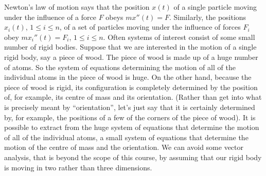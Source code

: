 Newton's law of motion says that the position $x(t)$
of a single particle moving under the influence
of a force $F$ obeys $mx''(t)=F$. Similarly, the positions $x_i(t)$,
$1\le i\le n$, of a set of particles moving under the influence
of forces $F_i$ obey $mx_i''(t)=F_i$, $1\le i\le n$. Often systems of
interest consist of some small number of rigid bodies. Suppose that
we are interested in the motion of a single rigid body, say a piece
of wood. The piece of wood is made up of a huge number of atoms.
So the system of equations determining the motion of all of the
individual atoms in the piece of wood is huge. On the other hand,
because the piece of wood is rigid, its configuration is completely
determined by the position of, for example, its centre of mass and
its orientation. (Rather than get into what is precisely meant by
``orientation'', let's just say that it is certainly determined by,
for example, the positions of a few of the corners of the piece of wood).
It is
possible to extract from the  huge system of equations that determine
the motion of all of the individual atoms, a small system of equations
that determine the motion of the centre of mass and the orientation.
We can avoid some vector analysis, that is beyond the scope of this
course, by assuming that our rigid body is moving in two rather than
three dimensions.

